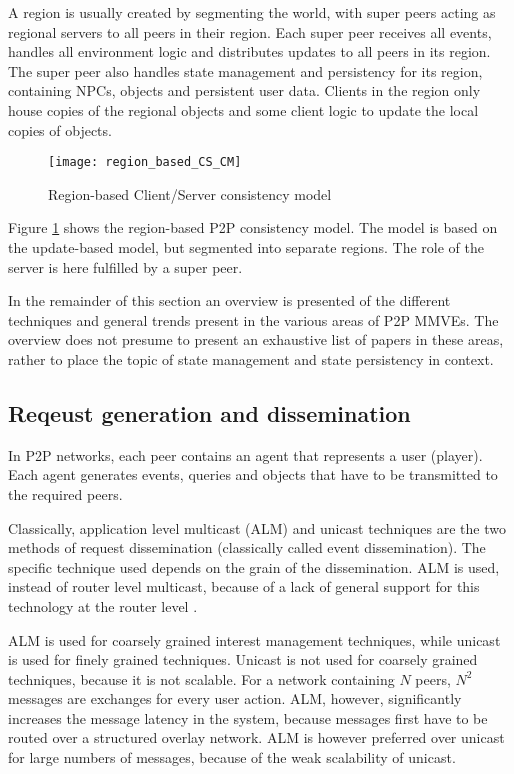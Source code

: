 A region is usually created by segmenting the world, with super peers acting as regional servers to all peers in their region. Each super peer receives all events, handles all environment logic and distributes updates to all peers in its region. The super peer also handles state management and persistency for its region, containing NPCs, objects and persistent user data. Clients in the region only house copies of the regional objects and some client logic to update the local copies of objects.

\begin{figure}[htbp]
 \centering
 \texttt{[image: region\_based\_CS\_CM]}
 \caption{Region-based Client/Server consistency model}
 \label{fig_cs_region_cm}
\end{figure}
%
Figure \ref{fig_cs_region_cm} shows the region-based P2P consistency model. The model is based on the update-based model, but segmented into separate regions. The role of the server is here fulfilled by a super peer.

In the remainder of this section an overview is presented of the different techniques and general trends present in the various areas of P2P MMVEs. The overview does not presume to present an exhaustive list of papers in these areas, rather to place the topic of state management and state persistency in context.

\subsection{Reqeust generation and dissemination}

In P2P networks, each peer contains an agent that represents a user (player). Each agent generates events, queries and objects that have to be transmitted to the required peers.

Classically, application level multicast (ALM) and unicast techniques are the two methods of request dissemination (classically called event dissemination). The specific technique used depends on the grain of the dissemination. ALM is used, instead of router level multicast, because of a lack of general support for this technology at the router level \cite{ip_multicast_deployment_issues}.

ALM is used for coarsely grained interest management techniques, while unicast is used for finely grained techniques. Unicast is not used for coarsely grained techniques, because it is not scalable. For a network containing $N$ peers, $N^2$ messages are exchanges for every user action. ALM, however, significantly increases the message latency in the system, because messages first have to be routed over a structured overlay network. ALM is however preferred over unicast for large numbers of messages, because of the weak scalability of unicast.


